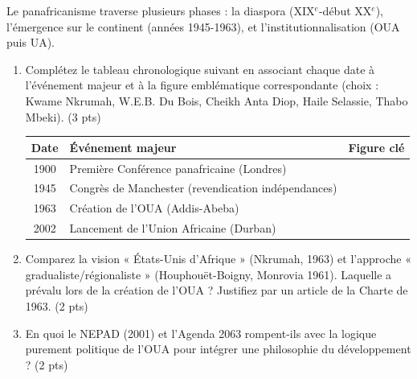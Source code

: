 \documentclass[11pt]{article}
\begin{document}
\begin{exercice}
    Le panafricanisme traverse plusieurs phases : la diaspora (XIX$^e$-début XX$^e$), l'émergence sur le continent (années 1945-1963), et l'institutionnalisation (OUA puis UA).

    \begin{enumerate}
        \item Complétez le tableau chronologique suivant en associant chaque date à l'événement majeur et à la figure emblématique correspondante (choix : Kwame Nkrumah, W.E.B. Du Bois, Cheikh Anta Diop, Haile Selassie, Thabo Mbeki). (3 pts)

        \begin{center}
        \begin{tabular}{|c|p{5cm}|p{3cm}|}
        \hline
        \textbf{Date} & \textbf{Événement majeur} & \textbf{Figure clé} \\
        \hline
        1900 & Première Conférence panafricaine (Londres) & \\
        1945 & Congrès de Manchester (revendication indépendances) & \\
        1963 & Création de l'OUA (Addis-Abeba) & \\
        2002 & Lancement de l'Union Africaine (Durban) & \\
        \hline
        \end{tabular}
        \end{center}

        \item Comparez la vision « États-Unis d'Afrique » (Nkrumah, 1963) et l'approche « gradualiste/régionaliste » (Houphouët-Boigny, Monrovia 1961). Laquelle a prévalu lors de la création de l'OUA ? Justifiez par un article de la Charte de 1963. (2 pts)
        \item En quoi le NEPAD (2001) et l'Agenda 2063 rompent-ils avec la logique purement politique de l'OUA pour intégrer une philosophie du développement ? (2 pts)
    \end{enumerate}
\end{exercice}
\end{document}
